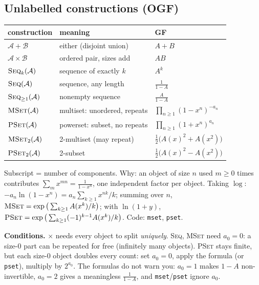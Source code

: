 	\subsection{Unlabelled constructions (OGF)}
	\begin{center}\small\renewcommand{\arraystretch}{1.3}
	\begin{tabular}{@{}l@{\ \ }L{2.75cm}@{\ \ }l@{}}
	construction & meaning & GF \\ \hline
	$\mathcal A+\mathcal B$ & either (disjoint union) & $A+B$ \\
	$\mathcal A\times\mathcal B$ & ordered pair, sizes add & $AB$ \\
	$\textsc{Seq}_k(\mathcal A)$ & sequence of exactly $k$ & $A^k$ \\
	$\textsc{Seq}(\mathcal A)$ & sequence, any length & $\frac1{1-A}$ \\
	$\textsc{Seq}_{\ge1}(\mathcal A)$ & nonempty sequence & $\frac{A}{1-A}$ \\
	$\textsc{MSet}(\mathcal A)$ & multiset: unordered, repeats & $\prod_{n\ge1}(1-x^n)^{-a_n}$ \\
	$\textsc{PSet}(\mathcal A)$ & powerset: subset, no repeats & $\prod_{n\ge1}(1+x^n)^{a_n}$ \\
	$\textsc{MSet}_2(\mathcal A)$ & 2-multiset (may repeat) & $\frac12\big(A(x)^2+A(x^2)\big)$ \\
	$\textsc{PSet}_2(\mathcal A)$ & 2-subset & $\frac12\big(A(x)^2-A(x^2)\big)$ \\
	\end{tabular}
	\end{center}
	Subscript = number of components.
	Why: an object of size $n$ used $m\ge0$ times contributes $\sum_mx^{mn}=\frac1{1-x^n}$, one independent factor per object. Taking $\log$: $-a_n\ln(1-x^n)=a_n\sum_{k\ge1}x^{nk}/k$; summing over $n$, $\textsc{MSet}=\exp\big(\sum_{k\ge1}A(x^k)/k\big)$; with $\ln(1+y)$, $\textsc{PSet}=\exp\big(\sum_{k\ge1}(-1)^{k-1}A(x^k)/k\big)$. Code: \texttt{mset}, \texttt{pset}.

	\textbf{Conditions.} $\times$ needs every object to split \emph{uniquely}. \textsc{Seq}, \textsc{MSet} need $a_0=0$: a size-$0$ part can be repeated for free (infinitely many objects). \textsc{PSet} stays finite, but each size-$0$ object doubles every count: set $a_0=0$, apply the formula (or \texttt{pset}), multiply by $2^{a_0}$. The formulas do not warn you: $a_0=1$ makes $1-A$ non-invertible, $a_0=2$ gives a meaningless $\frac1{1-A}$, and \texttt{mset}/\texttt{pset} ignore $a_0$.


